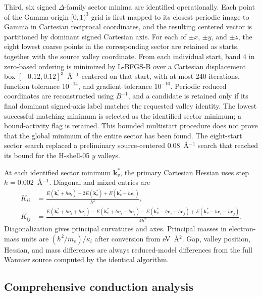 \documentclass[11pt]{article}
\theoremstyle{definition}
\begin{document}
Third, six signed $\Delta$-family sector minima are identified operationally.  Each
point of the Gamma-origin $[0,1)^3$ grid is first mapped to its closest periodic image to
Gamma in Cartesian reciprocal coordinates, and the resulting centered vector is
partitioned by dominant signed Cartesian axis.  For each of $\pm x$, $\pm y$, and
$\pm z$, the eight lowest coarse points in the corresponding sector are retained as
starts, together with the source valley coordinate.  From each individual start, band 4
in zero-based ordering is minimized by L-BFGS-B over a Cartesian displacement box
$[-0.12,0.12]^3$~\AA$^{-1}$ centered on that start, with at most 240 iterations, function tolerance
$10^{-14}$, and gradient tolerance $10^{-10}$.  Periodic reduced coordinates are
reconstructed using $B^{-1}$, and a candidate is retained only if its final dominant
signed-axis label matches the requested valley identity.  The lowest successful matching
minimum is selected as the identified sector minimum; a bound-activity flag is retained.
This bounded multistart procedure does not prove that the global minimum of the entire
sector has been found.  The eight-start sector search
replaced a preliminary source-centered $0.08$~\AA$^{-1}$ search that reached its bound
for the H-shell-05 $y$ valleys.

At each identified sector minimum $\mathbf k_v^*$, the primary Cartesian Hessian uses
step $h=0.002$~\AA$^{-1}$.  Diagonal and mixed entries are
\begin{align}
 K_{ii}&=\frac{E(\mathbf k_v^*+h\mathbf e_i)-2E(\mathbf k_v^*)+E(\mathbf k_v^*-h\mathbf e_i)}{h^2},\\
 K_{ij}&=\frac{E(\mathbf k_v^*+h\mathbf e_i+h\mathbf e_j)-E(\mathbf k_v^*+h\mathbf e_i-h\mathbf e_j)
 -E(\mathbf k_v^*-h\mathbf e_i+h\mathbf e_j)+E(\mathbf k_v^*-h\mathbf e_i-h\mathbf e_j)}{4h^2}.
 \label{eq:finite-hessian}
\end{align}
Diagonalization gives principal curvatures and axes.  Principal masses in electron-mass
units are $(\hbar^2/m_e)/\kappa_i$ after conversion from eV~\AA$^2$.  Gap, valley
position, Hessian, and mass differences are always reduced-model differences from the
full Wannier source computed by the identical algorithm.

\subsection{Comprehensive conduction analysis}
\end{document}
